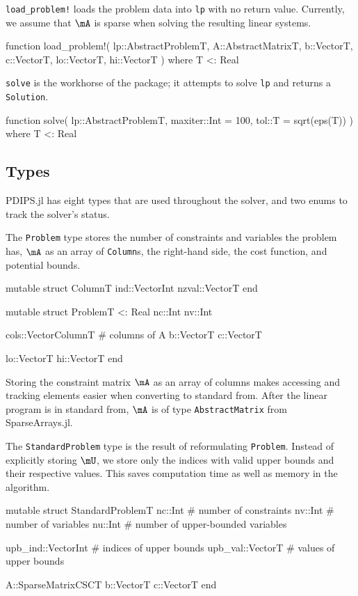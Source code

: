 \documentclass[titlepage]{abhi-tufte-handout}
\begin{document}
\texttt{load\_problem!} loads the problem data into \texttt{lp} with no return
value. Currently, we assume that \(\mA\) is sparse when solving the
resulting linear systems.
\begin{dispjulia}
function load_problem!(
    lp::AbstractProblem{T},
    A::AbstractMatrix{T},
    b::Vector{T},
    c::Vector{T},
    lo::Vector{T},
    hi::Vector{T}
) where T <: Real
\end{dispjulia}

\texttt{solve} is the workhorse of the package; it attempts to solve \texttt{lp}
and returns a \texttt{Solution}.
\begin{dispjulia}
function solve(
    lp::AbstractProblem{T},
    maxiter::Int = 100,
    tol::T = sqrt(eps(T))
) where T <: Real
\end{dispjulia}

\subsection{Types}\label{sec:types}
PDIPS.jl has eight types that are used throughout the solver, and two enums to
track the solver's status.

The \texttt{Problem} type stores the number of constraints and variables the
problem has, \(\mA\) as an array of \texttt{Column}s, the right-hand side,
the cost function, and potential bounds.
\begin{dispjulia}
mutable struct Column{T}
    ind::Vector{Int}
    nzval::Vector{T}
end
\end{dispjulia}

\begin{dispjulia}
mutable struct Problem{T <: Real}
    nc::Int
    nv::Int

    cols::Vector{Column{T}} # columns of A
    b::Vector{T}
    c::Vector{T}

    lo::Vector{T}
    hi::Vector{T}
end
\end{dispjulia}
Storing the constraint matrix \(\mA\) as an array of columns makes accessing
and tracking elements easier when converting to standard from. After the
linear program is in standard from, \(\mA\) is of type \texttt{AbstractMatrix}
from SparseArrays.jl.

The \texttt{StandardProblem} type is the result of reformulating
\texttt{Problem}. Instead of explicitly storing \(\mU\), we store only the
indices with valid upper bounds and their respective values. This saves
computation time as well as memory in the algorithm.
\begin{dispjulia}
mutable struct StandardProblem{T}
    nc::Int # number of constraints
    nv::Int # number of variables
    nu::Int # number of upper-bounded variables

    upb_ind::Vector{Int} # indices of upper bounds
    upb_val::Vector{T}   # values of upper bounds

    A::SparseMatrixCSC{T}
    b::Vector{T}
    c::Vector{T}
end
\end{dispjulia}
\end{document}
